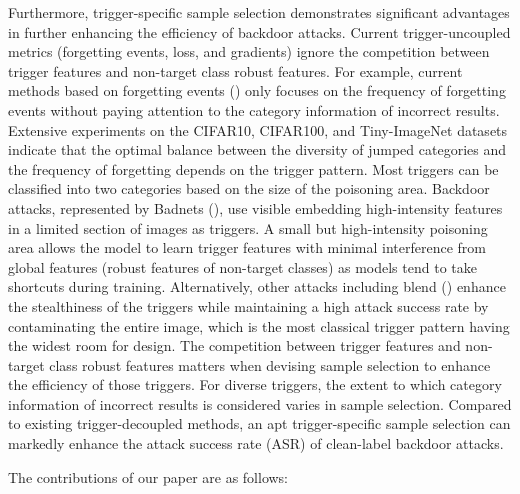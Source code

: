 \documentclass{article}
\begin{document}
Furthermore, trigger-specific sample selection demonstrates significant advantages in further enhancing the efficiency of backdoor attacks.  Current trigger-uncoupled metrics (forgetting events, loss, and gradients) ignore the competition between trigger features and non-target class robust features. For example, current methods based on forgetting events (\citet{gao2023not}) only focuses on the frequency of forgetting events without paying attention to the category information of incorrect results. Extensive experiments on the CIFAR10, CIFAR100, and Tiny-ImageNet datasets indicate that the optimal balance between the diversity of jumped categories and the frequency of forgetting depends on the trigger pattern. Most triggers can be classified into two categories based on the size of the poisoning area. Backdoor attacks, represented by Badnets (\citet{gu2017badnets}), use visible embedding high-intensity features in a limited section of images as triggers. A small but high-intensity poisoning area allows the model to learn trigger features with minimal interference from global features (robust features of non-target classes) as models tend to take shortcuts during training. Alternatively, other attacks including blend (\citet{chen2017targeted}) enhance the stealthiness of the triggers while maintaining a high attack success rate by contaminating the entire image, which is the most classical trigger pattern having the widest room for design. The competition between trigger features and non-target class robust features matters when devising sample selection to enhance the efficiency of those triggers. For diverse triggers, the extent to which category information of incorrect results is considered varies in sample selection. Compared to existing trigger-decoupled methods, an apt trigger-specific sample selection can markedly enhance the attack success rate (ASR) of clean-label backdoor attacks.

The contributions of our paper are as follows:
\end{document}
